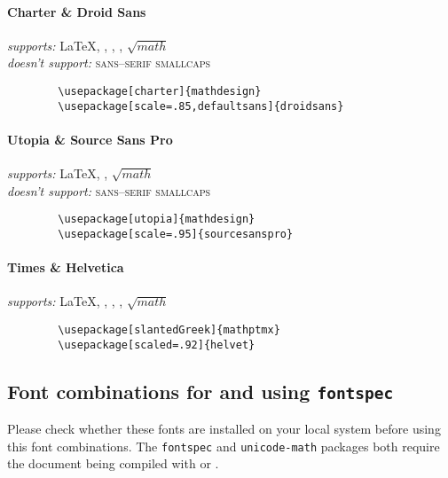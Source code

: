 \documentclass[11pt]{ltxdoc}
\begin{document}
	\paragraph*{Charter \& Droid Sans} \hfill
	\textit{supports:} \LaTeX, , , , $\sqrt{math}$ \\
	\textit{doesn't support:} \textsc{\textsf{sans--serif smallcaps}} \nopagebreak\vspace{-2em}
	\begin{verbatim}
		\usepackage[charter]{mathdesign}
		\usepackage[scale=.85,defaultsans]{droidsans}
	\end{verbatim}
	
	\paragraph*{Utopia \& Source Sans Pro} \hfill
	\textit{supports:} \LaTeX, , $\sqrt{math}$ \\
	\textit{doesn't support:} \textsc{\textsf{sans--serif smallcaps}} \nopagebreak\vspace{-2em}
	\begin{verbatim}
		\usepackage[utopia]{mathdesign}
		\usepackage[scale=.95]{sourcesanspro}	
	\end{verbatim}
	
	\paragraph*{Times \& Helvetica} \hfill
	\textit{supports:} \LaTeX, , , , $\sqrt{math}$ \nopagebreak\vspace{-.75em}
	\begin{verbatim}
		\usepackage[slantedGreek]{mathptmx}
		\usepackage[scaled=.92]{helvet}
	\end{verbatim}

	
	\justifying
	\subsection{Font combinations for  and  using \texttt{fontspec}}
	Please check whether these fonts are installed on your local system before using this font combinations.
	The \texttt{fontspec} and \texttt{unicode-math} packages both require the document being compiled with  or .
	
\end{document}
